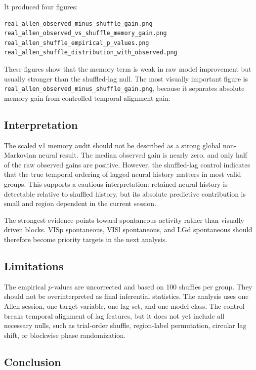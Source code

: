 It produced four figures:

\begin{verbatim}
real_allen_observed_minus_shuffle_gain.png
real_allen_observed_vs_shuffle_memory_gain.png
real_allen_shuffle_empirical_p_values.png
real_allen_shuffle_distribution_with_observed.png
\end{verbatim}

These figures show that the memory term is weak in raw model improvement but usually stronger than the shuffled-lag null. The most visually important figure is \texttt{real\_allen\_observed\_minus\_shuffle\_gain.png}, because it separates absolute memory gain from controlled temporal-alignment gain.

\subsection{Interpretation}

The scaled v1 memory audit should not be described as a strong global non-Markovian neural result. The median observed gain is nearly zero, and only half of the raw observed gains are positive. However, the shuffled-lag control indicates that the true temporal ordering of lagged neural history matters in most valid groups. This supports a cautious interpretation: retained neural history is detectable relative to shuffled history, but its absolute predictive contribution is small and region dependent in the current session.

The strongest evidence points toward spontaneous activity rather than visually driven blocks. VISp spontaneous, VISl spontaneous, and LGd spontaneous should therefore become priority targets in the next analysis.

\subsection{Limitations}

The empirical \(p\)-values are uncorrected and based on 100 shuffles per group. They should not be overinterpreted as final inferential statistics. The analysis uses one Allen session, one target variable, one lag set, and one model class. The control breaks temporal alignment of lag features, but it does not yet include all necessary nulls, such as trial-order shuffle, region-label permutation, circular lag shift, or blockwise phase randomization.

\subsection{Conclusion}

